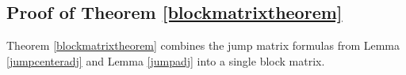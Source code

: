 \documentclass[thesis.tex]{subfiles}
\begin{document}
\subsection{Proof of Theorem \ref{blockmatrixtheorem}}

Theorem \ref{blockmatrixtheorem} combines the jump matrix formulas from Lemma \ref{jumpcenteradj} and Lemma \ref{jumpadj} into a single block matrix. 

\iffulldocument\else
	
	
\fi
\end{document}
